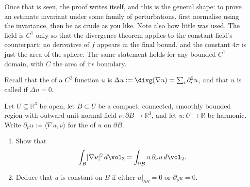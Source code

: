 \begin{example}
\begin{remark}
Once that is seen, the proof writes itself, and this is the general shape: to prove an estimate
invariant under some family of perturbations, first normalise using the invariance, then be as
crude as you like. Note also how little was used. The field is $C^1$ only so that the divergence
theorem applies to the constant field's counterpart; no derivative of $f$ appears in the final
bound, and the constant $4\pi$ is just the area of the sphere. The same statement holds for any
bounded $C^1$ domain, with $C$ the area of its boundary.
\end{remark}
\end{example}

\begin{exercise}
\label{ex:green_first_identity_harmonic}
Recall that the   of a $C^2$ function $u$ is
$\Delta u := \divg(\nabla u) = \sum_{i}\partial_i^2 u$, and that $u$ is called
  if $\Delta u = 0$.

Let $U \subseteq \mathbb{R}^3$ be open, let $B \subset U$ be a compact, connected, smoothly
bounded region with outward unit normal field $\nu : \partial B \to \mathbb{R}^3$, and let
$u : U \to \mathbb{R}$ be harmonic. Write $\partial_\nu u := \langle\nabla u,\nu\rangle$ for the
  of $u$ on $\partial B$.
\begin{enumerate}[label=\textbf{(\alph*)}]
  \item Show that
    \[\int_B \lvert\nabla u\rvert^2 \,d\vol_3 = \int_{\partial B} u\,\partial_\nu u \,d\vol_2 .\]
  \item Deduce that $u$ is constant on $B$ if either $u|_{\partial B} = 0$ or
    $\partial_\nu u = 0$.
\end{enumerate}
\end{exercise}

